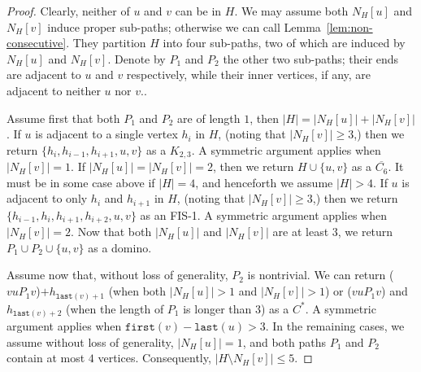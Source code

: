 \documentclass[10pt]{article}
\newcommand{\head}[1]{\ensuremath{{\mathtt{last}(#1)}}}
\newcommand{\tail}[1]{\ensuremath{{\mathtt{first}(#1)}}}
\begin{document}
\begin{proof}
  Clearly, neither of $u$ and $v$ can be in $H$.  We may assume both
  $N_H[u]$ and $N_H[v]$ induce proper sub-paths; otherwise we can call
  Lemma~\ref{lem:non-consecutive}.  They partition $H$ into four
  sub-paths, two of which are induced by $N_H[u]$ and $N_H[v]$.
  Denote by $P_1$ and $P_2$ the other two sub-paths; their ends are
  adjacent to $u$ and $v$ respectively, while their inner vertices, if
  any, are adjacent to neither $u$ nor $v$..

  Assume first that both $P_1$ and $P_2$ are of length $1$, then $|H|
  = |N_H[u]| + |N_H[v]|$.  If $u$ is adjacent to a single vertex $h_i$
  in $H$, (noting that $|N_H[v]|\ge 3$,) then we return $\{h_i,
  h_{i-1}, h_{i+1}, u, v\}$ as a $K_{2,3}$.  A symmetric argument
  applies when $|N_H[v]|= 1$.  If $|N_H[u]| = |N_H[v]| = 2$, then we
  return $H\cup \{u,v\}$ as a $\overline{C_6}$.  It must be in some
  case above if $|H| = 4$, and henceforth we assume $|H| > 4$.  If $u$
  is adjacent to only $h_i$ and $h_{i+1}$ in $H$, (noting that
  $|N_H[v]|\ge 3$,) then we return $\{h_{i-1}, h_i, h_{i+1}, h_{i+2},
  u, v\}$ as an FIS-1.  A symmetric argument applies when $|N_H[v]|=
  2$.  Now that both $|N_H[u]|$ and $|N_H[v]|$ are at least $3$, we
  return $P_1\cup P_2\cup\{u,v\}$ as a domino.

  Assume now that, without loss of generality, $P_2$ is nontrivial.
  We can return ($v u P_1 v$)$+h_{\head{v} + 1}$ (when both $|N_H[u]|
  > 1$ and $|N_H[v]| > 1$) or ($v u P_1 v$) and $h_{\head{v} + 2}$ (when
  the length of $P_1$ is longer than $3$) as a $C^*$.  A symmetric
  argument applies when $\tail{v} - \head{u} > 3$.  In the remaining
  cases, we assume without loss of generality, $|N_H[u]| = 1$, and
  both paths $P_1$ and $P_2$ contain at most $4$ vertices.
  Consequently, $|H\setminus N_H[v]|\le 5$.


\end{proof}
\end{document}
